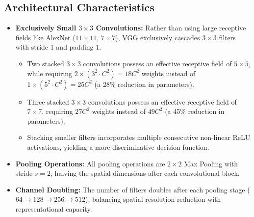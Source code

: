 \documentclass[12pt,a4paper]{article}
\begin{document}
\subsection{Architectural Characteristics}
\begin{itemize}[leftmargin=*]
\item \textbf{Exclusively Small $3 \times 3$ Convolutions:}
Rather than using large receptive fields like AlexNet ($11 \times 11$, $7 \times 7$), VGG exclusively cascades $3 \times 3$ filters with stride 1 and padding 1.
\begin{itemize}
    \item Two stacked $3 \times 3$ convolutions possess an effective receptive field of $5 \times 5$, while requiring $2 \times (3^2 \cdot C^2) = 18C^2$ weights instead of $1 \times (5^2 \cdot C^2) = 25C^2$ (a 28\% reduction in parameters).
    \item Three stacked $3 \times 3$ convolutions possess an effective receptive field of $7 \times 7$, requiring $27C^2$ weights instead of $49C^2$ (a 45\% reduction in parameters).
    \item Stacking smaller filters incorporates multiple consecutive non-linear ReLU activations, yielding a more discriminative decision function.
\end{itemize}
\item \textbf{Pooling Operations:} All pooling operations are $2 \times 2$ Max Pooling with stride $s=2$, halving the spatial dimensions after each convolutional block.
\item \textbf{Channel Doubling:} The number of filters doubles after each pooling stage ($64 \to 128 \to 256 \to 512$), balancing spatial resolution reduction with representational capacity.
\end{itemize}
\end{document}
